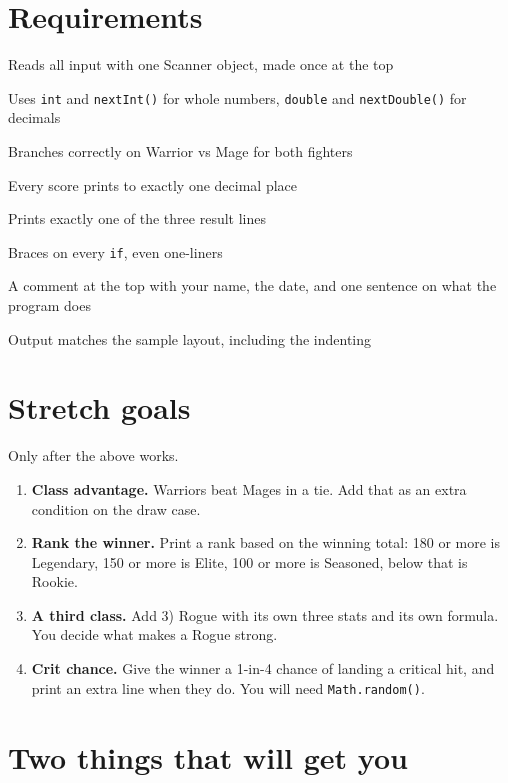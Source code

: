 \documentclass[11pt]{article}
\newcommand{\code}[1]{\texttt{#1}}
\begin{document}
\section{Requirements}

\begin{checks}
\item Reads all input with one Scanner object, made once at the top
\item Uses \code{int} and \code{nextInt()} for whole numbers, \code{double} and \code{nextDouble()} for decimals
\item Branches correctly on Warrior vs Mage for both fighters
\item Every score prints to exactly one decimal place
\item Prints exactly one of the three result lines
\item Braces on every \code{if}, even one-liners
\item A comment at the top with your name, the date, and one sentence on what the program does
\item Output matches the sample layout, including the indenting
\end{checks}

\section{Stretch goals}

Only after the above works.

\begin{enumerate}
\item \textbf{Class advantage.} Warriors beat Mages in a tie. Add that as an extra condition on the draw case.
\item \textbf{Rank the winner.} Print a rank based on the winning total: 180 or more is Legendary, 150 or more is Elite, 100 or more is Seasoned, below that is Rookie.
\item \textbf{A third class.} Add 3) Rogue with its own three stats and its own formula. You decide what makes a Rogue strong.
\item \textbf{Crit chance.} Give the winner a 1-in-4 chance of landing a critical hit, and print an extra line when they do. You will need \code{Math.random()}.
\end{enumerate}

\section{Two things that will get you}
\end{document}
